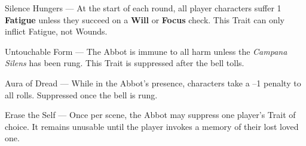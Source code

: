 \documentclass[nodeprecatedcode,bg=print]{dndbook}
\begin{document}
\begin{paracol}{2}
    \begin{TraitsBox}
    \item[Silence Hungers] — At the start of each round, all player characters suffer 1 \textbf{Fatigue} unless they succeed on a  \textbf{Will} or \textbf{Focus} check. This Trait can only inflict Fatigue, not Wounds.
    \item[Untouchable Form] — The Abbot is immune to all harm unless the \emph{Campana Silens} has been rung. This Trait is suppressed after the bell tolls.
    \item[Aura of Dread] — While in the Abbot’s presence, characters take a –1 penalty to all rolls. Suppressed once the bell is rung.
    \item[Erase the Self] — Once per scene, the Abbot may suppress one player’s Trait of choice. It remains unusable until the player invokes a memory of their lost loved one.
    \end{TraitsBox}

    \DamageBox[%
        totalfatigue=3,%
        totalmild=2,%
        totalmoderate=1,%
        totalsevere=0,%
    ]

\end{paracol}
\end{document}
